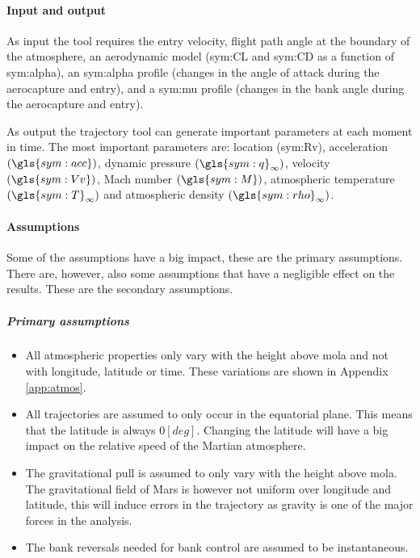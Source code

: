 \paragraph{Input and output}
As input the tool requires the entry velocity, flight path angle at the boundary of the atmosphere, an aerodynamic model (\gls{sym:CL} and \gls{sym:CD} as a function of \gls{sym:alpha}), an \gls{sym:alpha} profile (changes in the angle of attack during the aerocapture and entry), and a \gls{sym:mu} profile (changes in the bank angle during the aerocapture and entry).

As output the trajectory tool can generate important parameters at each moment in time. The most important parameters are: location (\gls{sym:Rv}), acceleration $\left(\gls{sym:acc}\right)$, dynamic pressure $\left(\gls{sym:q}_{\infty}\right)$, velocity $\left(\gls{sym:Vv}\right)$, Mach number $\left(\gls{sym:M}\right)$, atmospheric temperature $\left(\gls{sym:T}_{\infty}\right)$ and atmospheric density $\left(\gls{sym:rho}_{\infty}\right)$.

\paragraph{Assumptions}
 \label{sec:astroassumption}
 Some of the assumptions have a big impact, these are the primary assumptions. There are, however, also some assumptions that have a negligible effect on the results. These are the secondary assumptions.
 
 \subparagraph{Primary assumptions}
 \begin{itemize}
 \item All atmospheric properties only vary with the height above \gls{mola} and not with longitude, latitude or time. These variations are shown in Appendix \ref{app:atmos}. 
 \item All trajectories are assumed to only occur in the equatorial plane. This means that the latitude is always $0 \left[deg\right]$. Changing the latitude will have a big impact on the relative speed of the Martian atmosphere.
 \item The gravitational pull is assumed to only vary with the height above \gls{mola}. The gravitational field of Mars is however not uniform over longitude and latitude, this will induce errors in the trajectory as gravity is one of the major forces in the analysis.
 \item The bank reversals needed for bank control are assumed to be instantaneous.
 \end{itemize}

